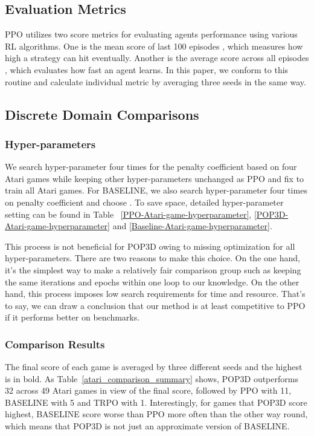 \documentclass{article}
\begin{document}
\subsection{Evaluation Metrics}
PPO utilizes two score metrics for evaluating  agents performance using various RL algorithms. One is the mean score of last 100 episodes , which measures how high a strategy can hit eventually. Another is the average score across all episodes , which evaluates how fast an agent learns. In this paper, we  conform to this routine and calculate individual metric by averaging three seeds in the same way.

\subsection{Discrete Domain Comparisons}
\subsubsection{Hyper-parameters}
We search hyper-parameter four times for the penalty coefficient  based on four Atari games while keeping other hyper-parameters unchanged as PPO and fix  to train all Atari games. For BASELINE, we also search hyper-parameter four times on penalty coefficient  and choose . To save space, detailed hyper-parameter setting can be found in Table~ \ref{PPO-Atari-game-hyperparameter}, \ref{POP3D-Atari-game-hyperparameter} and  \ref{Baseline-Atari-game-hyperparameter}.

This process is not beneficial for POP3D owing to missing optimization for all hyper-parameters. There are two reasons to make this choice. On the one hand, it’s the simplest way to make a relatively fair comparison group such as keeping
the same iterations and epochs within one loop to our knowledge. On the other hand, this process imposes low search requirements for time and resource. That's to say,  we can draw a  conclusion that our method is at least competitive to PPO if it performs better on benchmarks.  

\subsubsection{Comparison Results}

The final score of  each game  is averaged by three different seeds and the highest is in bold. As Table~\ref{atari_comparison_summary} shows, POP3D outperforms 32 across 49 Atari games in view of the final score, followed by PPO with 11, BASELINE with 5 and TRPO with 1. Interestingly, for games that POP3D score highest, BASELINE score worse than PPO more often than the other way round, which means that POP3D is not just an approximate version of BASELINE.  
\end{document}
